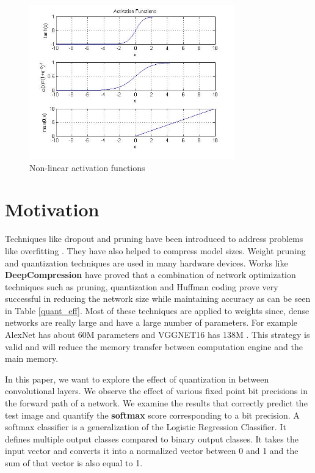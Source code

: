 \documentclass[conference]{IEEEtran}
\begin{document}
 \begin{figure}[!h]
\centering
\includegraphics[width=3.5in]{activation}
\caption{Non-linear activation functions}
\label{act}
\end{figure}




\section{ Motivation} 
Techniques like dropout and pruning have been introduced to address problems like overfitting \cite{srivastava2014dropout,zhu2017prune}. They have also helped to compress model sizes. Weight pruning and quantization techniques are used in many hardware devices. 
\cite{han2016eie, jouppi2017datacenter, DBLP:journals/corr/IandolaMAHDK16, jiang2017xnor, tang2017binary}
Works like \textbf{DeepCompression} \cite{han2015deep} have proved that a combination of network optimization techniques such as pruning, quantization and Huffman coding prove very successful in reducing the network size while maintaining accuracy as can be seen in Table \ref{quant_eff}. Most of these techniques are applied to weights since, dense networks are really large and have a large number of parameters. For example AlexNet has about 60M parameters\cite{krizhevsky2012imagenet} and VGGNET16 has 138M \cite{simonyan2014very}. This strategy is valid and will reduce the memory transfer between computation engine and the main memory.

In this paper, we want to explore the effect of quantization in between convolutional layers. We observe the effect of various fixed point bit precisions in the forward path of a network. We examine the results that correctly predict the test image and quantify the \textbf{softmax} score corresponding to a bit precision. A softmax classifier is a generalization of the Logistic Regression Classifier. It defines multiple output classes compared to binary output classes. It takes the input vector and converts it into a normalized vector between 0 and 1 and the sum of that vector is also equal to 1. 
\end{document}
